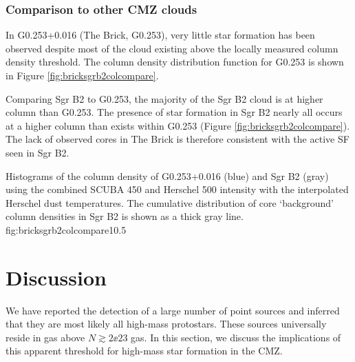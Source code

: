 \documentclass[twocolumn]{aastex61}
\begin{document}

\subsubsection{Comparison to other CMZ clouds}
In G0.253+0.016 (The Brick, G0.253), very little star formation
has been observed \citep{Longmore2013a,Johnston2014a,Rathborne2015a} despite
most of the cloud existing above the locally measured \citet{Lada2010a} column
density threshold.  The column density distribution function for G0.253
is shown in Figure \ref{fig:bricksgrb2colcompare}.

Comparing Sgr B2 to G0.253, the majority of the Sgr B2 cloud is at higher
column than G0.253.  The presence of star formation in Sgr B2 nearly all occurs
at a higher column than exists within G0.253 (Figure
\ref{fig:bricksgrb2colcompare}).  The lack of observed cores in The Brick is
therefore consistent with the active SF seen in Sgr B2.

{Histograms of the column density of G0.253+0.016 (blue) and Sgr B2 (gray)
using the combined SCUBA 450 \um and Herschel 500 \um intensity with the
interpolated Herschel dust temperatures.  The cumulative distribution of
core `background' column densities in Sgr B2 is shown as a thick gray
line.}
{fig:bricksgrb2colcompare}{1}{0.5\textwidth}

\section{Discussion}
We have reported the detection of a large number of point sources and inferred
that they are most likely all high-mass protostars.  These sources universally
reside in gas above $N\gtrsim2\ee{23}$ \persc gas.  In this section, we discuss
the implications of this apparent threshold for high-mass star formation in the
CMZ.
\end{document}
